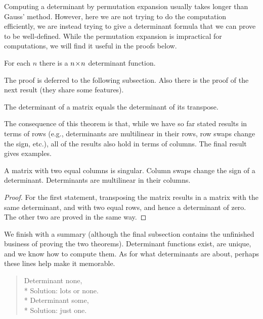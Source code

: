 Computing a determinant by permutation expansion usually takes longer than
Gauss' method.
However, here we are not trying to do the computation efficiently, 
we are instead 
trying to give a determinant formula that we can prove to be well-defined. 
While the permutation expansion is impractical for computations,
we will find it useful in  the proofs below.

\begin{theorem}
 \label{th:DetsExist}
For each $n$ there is a $n \! \times \! n$ determinant function.
\end{theorem}

The proof is deferred to the following subsection.
Also there is the proof of the next result (they share some features).

\begin{theorem}
The determinant of a matrix equals the determinant of its transpose.
\end{theorem}

The consequence of this theorem is that,
while we have so far stated results in terms of rows
(e.g., determinants are multilinear in their rows, row swaps change the
sign, etc.),
all of the results also hold in terms of columns.
The final result gives examples. 

\begin{corollary} \label{cor:ColSwapChgSign} \label{cor:DetsMultiInCols}
  A matrix with two equal columns is singular.
  Column swaps change the sign of a determinant.
  Determinants are multilinear in their columns.
\end{corollary}

\begin{proof}
For the first statement, 
transposing the matrix results in a matrix with the same determinant,
and with two equal rows, and hence a determinant of zero.
The other two are proved in the same way.
\end{proof}

We finish with a summary
(although the final subsection contains the unfinished business of
proving the two theorems).
Determinant functions exist, are unique, and we know how to compute them.
As for what determinants are about, perhaps these lines
\cite{Kemp} help make it memorable.
\begin{verse}
Determinant none,         \\*
Solution: lots or none.   \\*
Determinant some,         \\*
Solution: just one.
\end{verse}




